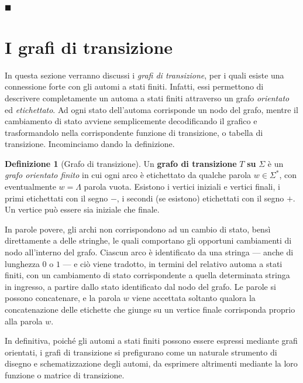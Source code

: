 \documentclass[10pt]{\classname}
\theoremstyle{newlinethm}
\theoremstyle{theorem}
\theoremstyle{definition}
\newtheorem{definizione}{Definizione}[section]
\theoremstyle{definition}
\theoremstyle{definition}
\theoremstyle{definition}
\begin{document}
\begin{flushright}
$\blacksquare$
\end{flushright}

\clearpage


\section{I grafi di transizione}

In questa sezione verranno discussi i \emph{grafi di transizione}, per i quali esiste una connessione forte con gli automi a stati finiti. Infatti, essi permettono di descrivere completamente un automa a stati finiti attraverso un grafo \emph{orientato} ed \emph{etichettato}. Ad ogni stato dell'automa corrisponde un nodo del grafo, mentre il cambiamento di stato avviene semplicemente decodificando il grafico e trasformandolo nella corrispondente funzione di transizione, o tabella di transizione. Incominciamo dando la definizione.

\begin{definizione}[Grafo di transizione]
Un \textbf{grafo di transizione} $T$ \textbf{su} $\Sigma$ è un \emph{grafo orientato finito} in cui ogni arco è etichettato da qualche parola $w \in \Sigma^*$, con eventualmente $w =\Lambda$ parola vuota. Esistono i vertici iniziali e vertici finali, i primi etichettati con il segno $-$, i secondi (se esistono) etichettati con il segno $+$. Un vertice può essere sia iniziale che finale.
\end{definizione}

In parole povere, gli archi non corrispondono ad un cambio di stato, bensì direttamente a delle stringhe, le quali comportano gli opportuni cambiamenti di nodo all'interno del grafo. Ciascun arco è identificato da una stringa --- anche di lunghezza $0$ o $1$ --- e ciò viene tradotto, in termini del relativo automa a stati finiti, con un cambiamento di stato corrispondente a quella determinata stringa in ingresso, a partire dallo stato identificato dal nodo del grafo. Le parole si possono concatenare, e la parola $w$ viene accettata soltanto qualora la concatenazione delle etichette che giunge su un vertice finale corrisponda proprio alla parola $w$.

In definitiva, poiché gli automi a stati finiti possono essere espressi mediante grafi orientati, i grafi di transizione si prefigurano come un naturale strumento di disegno e schematizzazione degli automi, da esprimere altrimenti mediante la loro funzione o matrice di transizione.
\end{document}
